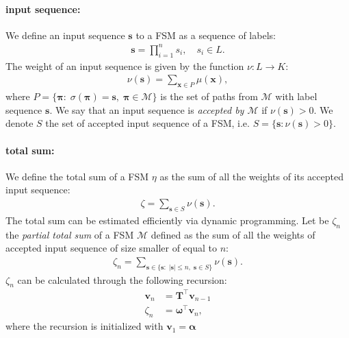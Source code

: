 \paragraph{input sequence:} We define an input sequence $\mathbf{s}$ to
a FSM as a sequence of labels:
\begin{align}
    \mathbf{s} = \prod_{i=1}^n s_i, \quad s_i \in L.
\end{align}
The weight of an input sequence is given by the function
$\nu: L \rightarrow K$:
\begin{align}
    \nu(\mathbf{s}) = \sum_{ \mathbf{x} \in P} \mu(\mathbf{x}),
\end{align}
where $P = \{\boldsymbol{\pi} : \; \sigma(\boldsymbol{\pi}) = \mathbf{s}, \;
\boldsymbol{\pi} \in \mathcal{M} \}$ is the set of paths from
$\mathcal{M}$ with label sequence $\mathbf{s}$.
We say that an input sequence is \emph{accepted by $\mathcal{M}$} if
$\nu(\mathbf{s}) > 0$. We denote $S$ the set of accepted input sequence
of a FSM, i.e. $S = \{\mathbf{s} : \nu(\mathbf{s}) > 0 \}$.

\paragraph{total sum:} We define the total sum of a FSM $\eta$ as the
sum of all the weights of its accepted input sequence:
\begin{align}
    \zeta = \sum_{\mathbf{s} \in S} \nu(\mathbf{s}).
\end{align}
The total sum can be estimated efficiently via dynamic programming. Let
be $\zeta_n$ the \emph{partial total sum} of a FSM $\mathcal{M}$
defined as the sum of all the weights of accepted input sequence of
size smaller of equal to $n$:
\begin{align}
    \zeta_n = \sum_{\mathbf{s} \in
        \{ \mathbf{s} : \; | \mathbf{s} | \le n, \; \mathbf{s} \in S \}}
        \nu(\mathbf{s}).
\end{align}
$\zeta_n$ can be calculated through the following recursion:
\begin{align}
    \mathbf{v}_n &= \mathbf{T}^\top \mathbf{v}_{n-1} \\
    \zeta_n &= \boldsymbol{\omega}^\top \mathbf{v}_n,
\end{align}
where the recursion is initialized with $\mathbf{v}_1 = \boldsymbol{\alpha}$

